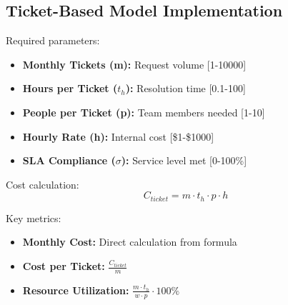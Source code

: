 \documentclass[12pt,a4paper]{article}
\newenvironment{definition}[1]
{\begin{mdframed}[style=definitionstyle,frametitle={Definition: #1}]}
{\end{mdframed}}
\begin{document}
\subsection{Ticket-Based Model Implementation}

\begin{definition}{Base Ticket Model Inputs}
Required parameters:
\begin{itemize}
    \item \textbf{Monthly Tickets (m):} Request volume [1-10000]
    \item \textbf{Hours per Ticket ($t_h$):} Resolution time [0.1-100]
    \item \textbf{People per Ticket (p):} Team members needed [1-10]
    \item \textbf{Hourly Rate (h):} Internal cost [\$1-\$1000]
    \item \textbf{SLA Compliance ($\sigma$):} Service level met [0-100\%]
\end{itemize}

Cost calculation:
\begin{equation}
    C_{ticket} = m \cdot t_h \cdot p \cdot h
\end{equation}

Key metrics:
\begin{itemize}
    \item \textbf{Monthly Cost:} Direct calculation from formula
    \item \textbf{Cost per Ticket:} $\frac{C_{ticket}}{m}$
    \item \textbf{Resource Utilization:} $\frac{m \cdot t_h}{w \cdot p} \cdot 100\%$
\end{itemize}
\end{definition}
\end{document}
